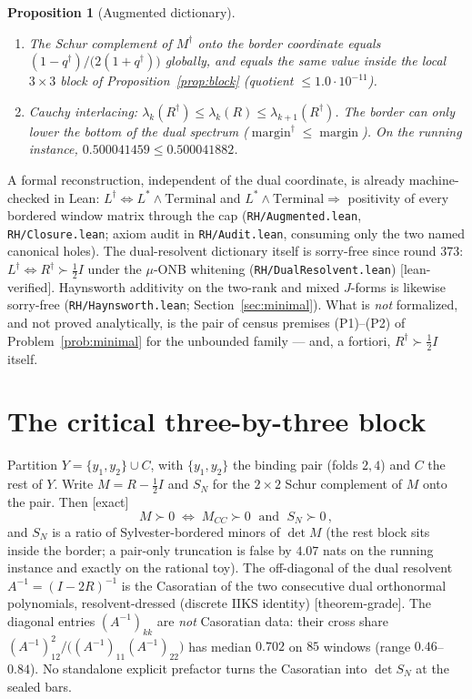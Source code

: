 \documentclass[11pt]{article}
\newtheorem{prop}{Proposition}
\theoremstyle{remark}
\newcommand{\Rd}{R^{\dagger}}
\newcommand{\Ld}{L^{\dagger}}
\newcommand{\Ls}{L^{*}}
\newcommand{\half}{\tfrac12}
\newcommand{\gr}[1]{\textnormal{\small[#1]}}
\begin{document}
\begin{prop}[Augmented dictionary]
\begin{enumerate}
(equals the squared dual border norm $u^{T}H^{-1}u/B$) and coincides
with the standing terminal coordinate.  The dictionary
$1-q^{\dagger}=(5/7)(1-q_{N})/B$ holds to relative
$6.7\cdot10^{-6}$.
\item[\textup{(A6)}]
The Schur complement of $M^{\dagger}$ onto the border coordinate
equals $(1-q^{\dagger})/\bigl(2(1+q^{\dagger})\bigr)$ globally, and
equals the same value inside the local $3\times3$ block of
Proposition~\ref{prop:block} (quotient $\le 1.0\cdot10^{-11}$).
\item[\textup{(A7)}]
Cauchy interlacing:
$\lambda_{k}(\Rd)\le\lambda_{k}(R)\le\lambda_{k+1}(\Rd)$.
The border can only lower the bottom of the dual spectrum
($\operatorname{margin}^{\dagger}\le\operatorname{margin}$).
On the running instance,
$0.500041459\le 0.500041882$.
\end{enumerate}
\end{prop}

A formal reconstruction, independent of the dual coordinate, is
already machine-checked in Lean: $\Ld\iff\Ls\wedge\mathrm{Terminal}$
and $\Ls\wedge\mathrm{Terminal}\Rightarrow$ positivity of every
bordered window matrix through the cap
(\texttt{RH/Augmented.lean}, \texttt{RH/Closure.lean};
axiom audit in \texttt{RH/Audit.lean}, consuming only the two named
canonical holes).  The dual-resolvent dictionary itself is
sorry-free since round 373: $\Ld\iff\Rd\succ\half I$ under the
$\mu$-ONB whitening (\texttt{RH/DualResolvent.lean})
\gr{lean-verified}.  Haynsworth additivity on the two-rank and mixed
$J$-forms is likewise sorry-free
(\texttt{RH/Haynsworth.lean}; Section~\ref{sec:minimal}).
What is \emph{not} formalized, and not proved analytically, is the
pair of census premises (P1)--(P2) of Problem~\ref{prob:minimal} for
the unbounded family --- and, a fortiori, $\Rd\succ\half I$ itself.

\section{The critical three-by-three block}\label{sec:block}

Partition $Y=\{y_{1},y_{2}\}\cup C$, with $\{y_{1},y_{2}\}$ the
binding pair (folds $2,4$) and $C$ the rest of $Y$.  Write
$M=R-\half I$ and $S_{N}$ for the $2\times2$ Schur complement of $M$
onto the pair.  Then \gr{exact}
\[
M\succ0
\;\iff\;
M_{CC}\succ0
\;\text{ and }\;
S_{N}\succ0\,,
\]
and $S_{N}$ is a ratio of Sylvester-bordered minors of $\det M$
(the rest block sits inside the border; a pair-only truncation is
false by $4.07$ nats on the running instance and exactly on the
rational toy).  The off-diagonal of the dual resolvent
$A^{-1}=(I-2R)^{-1}$ is the Casoratian of the two consecutive dual
orthonormal polynomials, resolvent-dressed (discrete IIKS identity)
\gr{theorem-grade}.  The diagonal entries $(A^{-1})_{kk}$ are
\emph{not} Casoratian data: their cross share
$(A^{-1})_{12}^{2}/\bigl((A^{-1})_{11}(A^{-1})_{22}\bigr)$ has
median $0.702$ on $85$ windows (range $0.46$--$0.84$).  No standalone
explicit prefactor turns the Casoratian into $\det S_{N}$ at the
sealed bars.
\end{document}
